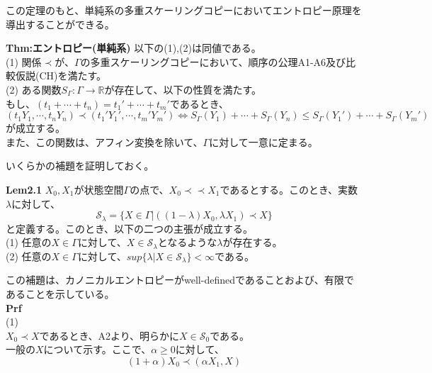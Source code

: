 \documentclass[a4paper,11pt]{jsarticle}
\begin{document}
この定理のもと、単純系の多重スケーリングコピーにおいてエントロピー原理を導出することができる。\\
\begin{itembox}[l]{\textbf{Thm:エントロピー(単純系)}}
    以下の(1),(2)は同値である。\\
    (1) 関係$\prec$が、$\Gamma$の多重スケーリングコピーにおいて、順序の公理A1-A6及び比較仮説(CH)を満たす。\\
    (2) ある関数$S_{\Gamma}:\Gamma \rightarrow \mathbb{R}$が存在して、以下の性質を満たす。\\
    もし、$(t_1+ \cdots +t_n)=t_1'+ \cdots +t_m'$であるとき、
    \begin{equation}
        (t_1 Y_1, \cdots ,t_n Y_n) \prec (t_1' Y_1', \cdots ,t_m' Y_m') \Leftrightarrow S_{\Gamma}(Y_1)+ \cdots +S_{\Gamma}(Y_n) \leq S_{\Gamma}(Y_1')+ \cdots +S_{\Gamma}(Y_m')
    \end{equation}
    が成立する。\\
    また、この関数は、アフィン変換を除いて、$\Gamma$に対して一意に定まる。

\end{itembox}
いくらかの補題を証明しておく。\\
\begin{itembox}[l]{\textbf{Lem2.1}}
$X_0,X_1$が状態空間$\Gamma$の点で、$X_0 \prec \prec X_1$であるとする。このとき、実数$\lambda$に対して、
\begin{equation}
    \mathcal{S}_{\lambda} = \{X\in \Gamma|((1-\lambda)X_0,\lambda X_1) \prec X \}
\end{equation}
と定義する。このとき、以下の二つの主張が成立する。\\
(1) 任意の$X \in \Gamma$に対して、$X \in \mathcal{S}_{\lambda}$となるような$\lambda$が存在する。\\
(2) 任意の$X \in \Gamma$に対して、$sup\{\lambda|X \in \mathcal{S}_{\lambda}\}<\infty$である。

\end{itembox}
この補題は、カノニカルエントロピーがwell-definedであることおよび、有限であることを示している。\\
\textbf{Prf}\\
(1) \\
$X_0 \prec X$であるとき、A2より、明らかに$X \in \mathcal{S}_0$である。\\
一般の$X$について示す。ここで、$\alpha \geq 0$に対して、
\begin{equation}
    (1+\alpha)X_0 \prec (\alpha X_1,X)
\end{equation}
\end{document}
